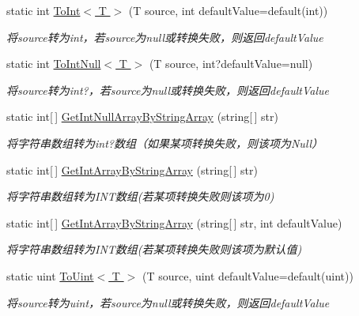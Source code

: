 \begin{DoxyCompactItemize}
static int \hyperlink{class_x_c_l_net_tools_1_1_common_1_1_data_type_convert_a0153e442c6d2a0ba381bf25dfef5cfb2}{To\-Int$<$ T $>$} (T source, int default\-Value=default(int))
\begin{DoxyCompactList}\small\item\em 将source转为int，若source为null或转换失败，则返回default\-Value \end{DoxyCompactList}\item 
static int \hyperlink{class_x_c_l_net_tools_1_1_common_1_1_data_type_convert_a58891c27d77c7a6aa44766167b64b4ce}{To\-Int\-Null$<$ T $>$} (T source, int?default\-Value=null)
\begin{DoxyCompactList}\small\item\em 将source转为int?，若source为null或转换失败，则返回default\-Value \end{DoxyCompactList}\item 
static int\mbox{[}$\,$\mbox{]} \hyperlink{class_x_c_l_net_tools_1_1_common_1_1_data_type_convert_ac3f26d844001e5094f02dc70ed10c3f5}{Get\-Int\-Null\-Array\-By\-String\-Array} (string\mbox{[}$\,$\mbox{]} str)
\begin{DoxyCompactList}\small\item\em 将字符串数组转为int?数组（如果某项转换失败，则该项为\-Null） \end{DoxyCompactList}\item 
static int\mbox{[}$\,$\mbox{]} \hyperlink{class_x_c_l_net_tools_1_1_common_1_1_data_type_convert_a4989f3ee0b2b95175ce7229c8e75a68a}{Get\-Int\-Array\-By\-String\-Array} (string\mbox{[}$\,$\mbox{]} str)
\begin{DoxyCompactList}\small\item\em 将字符串数组转为\-I\-N\-T数组(若某项转换失败则该项为0) \end{DoxyCompactList}\item 
static int\mbox{[}$\,$\mbox{]} \hyperlink{class_x_c_l_net_tools_1_1_common_1_1_data_type_convert_ae22c68e54a576fc1093ca3555789331c}{Get\-Int\-Array\-By\-String\-Array} (string\mbox{[}$\,$\mbox{]} str, int default\-Value)
\begin{DoxyCompactList}\small\item\em 将字符串数组转为\-I\-N\-T数组(若某项转换失败则该项为默认值) \end{DoxyCompactList}\item 
static uint \hyperlink{class_x_c_l_net_tools_1_1_common_1_1_data_type_convert_af6d9ff6103f191d91f38cfda562c25aa}{To\-Uint$<$ T $>$} (T source, uint default\-Value=default(uint))
\begin{DoxyCompactList}\small\item\em 将source转为uint，若source为null或转换失败，则返回default\-Value \end{DoxyCompactList}\item 

\end{DoxyCompactItemize}
